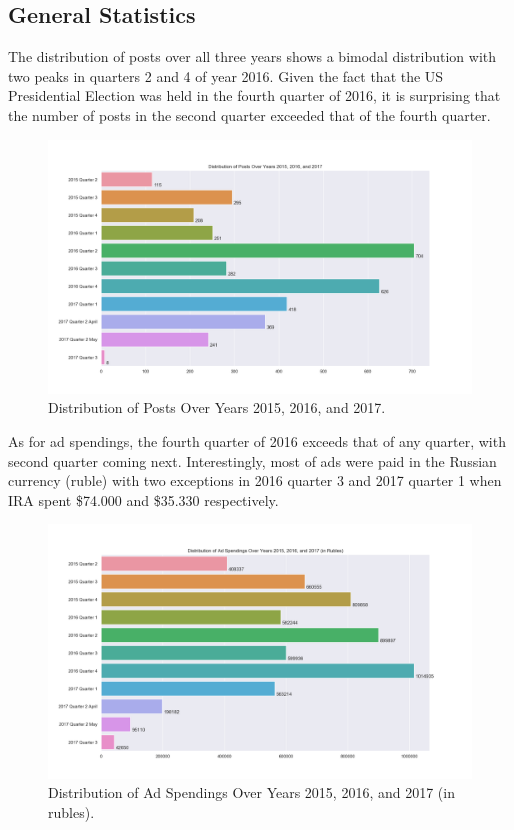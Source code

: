 \documentclass[12pt]{article}
\theoremstyle{definition}
\begin{document}
\subsection*{\centering General Statistics}
The distribution of posts over all three years shows a bimodal distribution
with two peaks in quarters 2 and 4 of year 2016. Given the fact that the US
Presidential Election was held in the fourth quarter of 2016, it is surprising
that the number of posts in the second quarter exceeded that of the fourth
quarter.

\begin{figure}[H]
\centering
\includegraphics[width=0.75\columnwidth]{./image/barchart-plots/barchart_distribution_of_posts.png}
\caption*{Distribution of Posts Over Years 2015, 2016, and 2017.}
\end{figure}

As for ad spendings, the fourth quarter of 2016 exceeds that of any quarter,
with second quarter coming next. Interestingly, most of ads were paid in the
Russian currency (ruble) with two exceptions in 2016 quarter 3 and 2017 quarter
1 when IRA spent \$74.000 and \$35.330 respectively.

\begin{figure}[H]
\centering
\includegraphics[width=0.75\columnwidth]{./image/barchart-plots/barchart_ad_spend_RU_distribution.png}
\caption*{Distribution of Ad Spendings Over Years 2015, 2016, and 2017 (in rubles).}
\end{figure}
\end{document}
